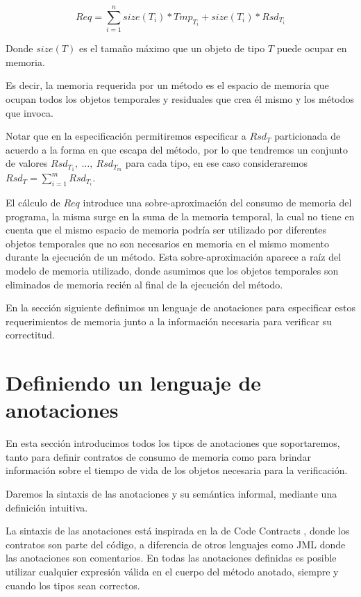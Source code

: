 \documentclass[12pt,a4paper]{article}
\begin{document}
				$$Req = \sum_{i=1}^{n} size(T_i) * Tmp_{T_i} + size(T_i) * Rsd_{T_i}$$

			Donde $size(T)$ es el tamaño máximo que un objeto de tipo $T$ puede ocupar en memoria.

			Es decir, la memoria requerida por un método es el espacio de memoria que ocupan todos los objetos temporales y residuales que crea él mismo y los métodos que invoca.

			Notar que en la especificación permitiremos especificar a $Rsd_T$ particionada de acuerdo a la forma en que escapa del método, por lo que tendremos un conjunto de valores $Rsd_{T_1},\ \dots,\ Rsd_{T_m}$ para cada tipo, en ese caso consideraremos $Rsd_T = \sum_{i = 1}^{m} Rsd_{T_i}$.

			El cálculo de $Req$ introduce una sobre-aproximación del consumo de memoria del programa, la misma surge en la suma de la memoria temporal, la cual no tiene en cuenta que el mismo espacio de memoria podría ser utilizado por diferentes objetos temporales que no son necesarios en memoria en el mismo momento durante la ejecución de un método. Esta sobre-aproximación aparece a raíz del modelo de memoria utilizado, donde asumimos que los objetos temporales son eliminados de memoria recién al final de la ejecución del método.

			En la sección siguiente definimos un lenguaje de anotaciones para especificar estos requerimientos de memoria junto a la información necesaria para verificar su correctitud.
	\newpage
	\section{Definiendo un lenguaje de anotaciones} \label{sec:defleng}
		En esta sección introducimos todos los tipos de anotaciones que soportaremos, tanto para definir contratos de consumo de memoria como para brindar información sobre el tiempo de vida de los objetos necesaria para la verificación.

		Daremos la sintaxis de las anotaciones y su semántica informal, mediante una definición intuitiva.

		La sintaxis de las anotaciones está inspirada en la de Code Contracts \cite{codecontracts}, donde los contratos son parte del código, a diferencia de otros lenguajes como JML donde las anotaciones son comentarios. En todas las anotaciones definidas es posible utilizar cualquier expresión válida en el cuerpo del método anotado, siempre y cuando los tipos sean correctos.
\end{document}

